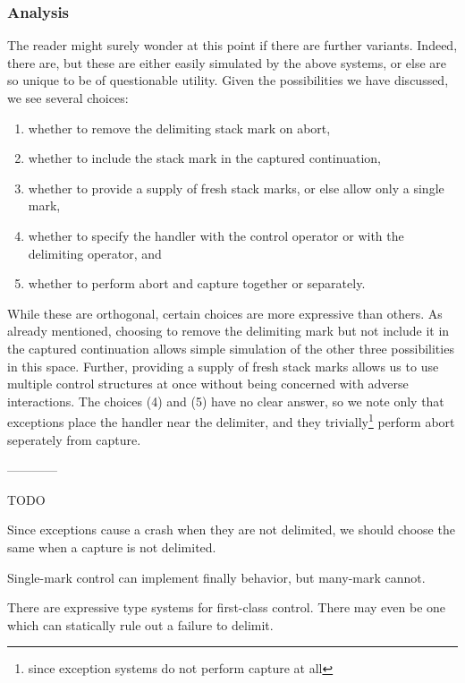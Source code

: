 \documentclass[11pt]{article}
\begin{document}
\subsubsection{Analysis}

The reader might surely wonder at this point if there are further variants.
Indeed, there are, but these are either easily simulated by the above systems, or else are so unique to be of questionable utility.
Given the possibilities we have discussed, we see several choices:
\begin{enumerate}
\item whether to remove the delimiting stack mark on abort,
\item whether to include the stack mark in the captured continuation,
\item whether to provide a supply of fresh stack marks, or else allow only a single mark,
\item whether to specify the handler with the control operator or with the delimiting operator, and
\item whether to perform abort and capture together or separately.
\end{enumerate}
While these are orthogonal, certain choices are more expressive than others.
As already mentioned, choosing to remove the delimiting mark but not include it in the captured continuation allows simple simulation of the other three possibilities in this space.
Further, providing a supply of fresh stack marks allows us to use multiple control structures at once without being concerned with adverse interactions.
The choices (4) and (5) have no clear answer, so we note only that exceptions place the handler near the delimiter, and they trivially\footnote{since exception systems do not perform capture at all} perform abort seperately from capture.



------------

TODO

Since exceptions cause a crash when they are not delimited, we should choose the same when a capture is not delimited.

Single-mark control can implement finally behavior, but many-mark cannot.

There are expressive type systems for first-class control.
There may even be one which can statically rule out a failure to delimit.
\end{document}
